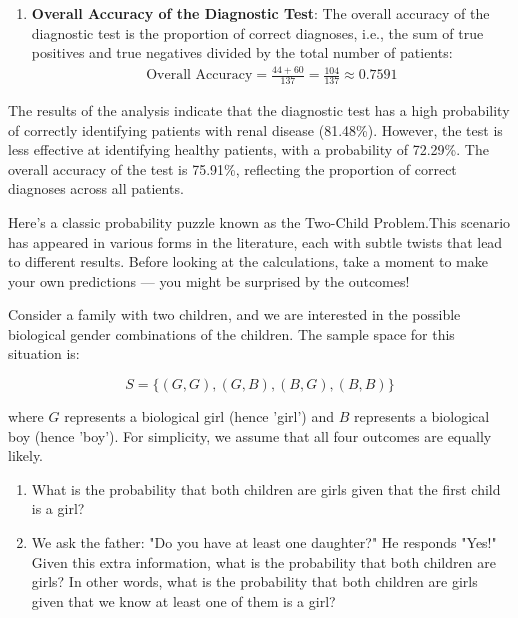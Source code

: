 \begin{solution}
\begin{enumerate}[label=(\alph*)]
        \item \textbf{Overall Accuracy of the Diagnostic Test}:
        The overall accuracy of the diagnostic test is the proportion of correct diagnoses, i.e., the sum of true positives and true negatives divided by the total number of patients:
        \begin{align*}
            \text{Overall Accuracy} =\frac{44+60}{137}=\frac{104}{137} \approx 0.7591
        \end{align*}
    \end{enumerate}


The results of the analysis indicate that the diagnostic test has a high probability of correctly identifying patients with renal disease (81.48\%). However, the test is less effective at identifying healthy patients, with a probability of 72.29\%. The overall accuracy of the test is 75.91\%, reflecting the proportion of correct diagnoses across all patients.
\end{solution}

Here’s a classic probability puzzle known as the Two-Child Problem.This scenario has appeared in various forms in the literature, each with subtle twists that lead to different results. Before looking at the calculations, take a moment to make your own predictions — you might be surprised by the outcomes!

\begin{example}
    Consider a family with two children, and we are interested in the possible biological gender combinations of the children. The sample space for this situation is:

\[
S = \{(G, G), (G, B), (B, G), (B, B)\}
\]

where \( G \) represents a biological girl (hence 'girl') and \( B \) represents a biological boy (hence 'boy'). For simplicity, we assume that all four outcomes are equally likely.

\begin{enumerate}[label=(\alph*)]
    \item What is the probability that both children are girls given that the first child is a girl?
    \item We ask the father: "Do you have at least one daughter?" He responds "Yes!" Given this extra information, what is the probability that both children are girls? In other words, what is the probability that both children are girls given that we know at least one of them is a girl?
\end{enumerate}
\end{example}

